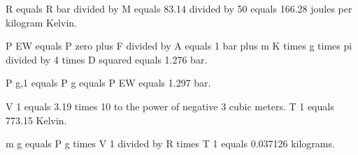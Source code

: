 R equals R bar divided by M equals 83.14 divided by 50 equals 166.28 joules per kilogram Kelvin.  

P EW equals P zero plus F divided by A equals 1 bar plus m K times g times pi divided by 4 times D squared equals 1.276 bar.  

P g,1 equals P g equals P EW equals 1.297 bar.  

V 1 equals 3.19 times 10 to the power of negative 3 cubic meters.  
T 1 equals 773.15 Kelvin.  

m g equals P g times V 1 divided by R times T 1 equals 0.037126 kilograms.